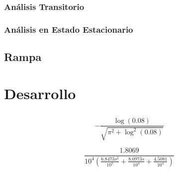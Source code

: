 \documentclass[12pt,a4paper]{article}
\begin{document}
        \subsubsection{Análisis Transitorio}

        \subsubsection{Análisis en Estado Estacionario}
          
      \subsection{Rampa}

        
      
        

	\pagebreak
	
	\section{Desarrollo}

    \subsection{}
	
  $$ -\frac{\log (0.08)}{\sqrt{\pi ^2+\log ^2(0.08)}} $$

  $$ \frac{1.8069}{10^4 \left(\frac{6.8473 s^2}{10^5}+\frac{8.0973 s}{10^4}+\frac{4.5081}{10^4}\right)} $$
	
\end{document}
